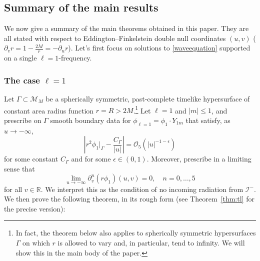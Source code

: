 \documentclass[11pt,english]{article}
\numberwithin{equation}{section}
\theoremstyle{remark}
\theoremstyle{plain}
\theoremstyle{remark}
\newcommand{\pu}{\partial_u}
\newcommand{\pv}{\partial_v}
\renewcommand{\(}{\left(}
\renewcommand{\)}{\right)}
\begin{document}
\subsection{Summary of the main results}\label{sec:intro:summary}
We now give a summary of the main theorems obtained in this paper. They are all stated with respect to Eddington--Finkelstein double null coordinates $(u,v)$ ($\pv r=1-\frac{2M}{r}=-\pu r$).
Let's first focus on solutions to \eqref{waveequation} supported on a single $\ell=1$-frequency.
\subsubsection{The case \texorpdfstring{$\ell=1$}{L=1}}\label{sec:1.2.1}
Let $\Gamma\subset \mathcal{M}_M$ be a spherically symmetric, past-complete timelike hypersurface of constant area radius function $r=R>2M$.\footnote{In fact, the theorem below also applies to spherically symmetric hypersurfaces $\Gamma$ on which $r$ is allowed to vary and, in particular, tend to infinity. We will show this in the main body of the paper.}
Let $\ell=1$ and $|m|\leq 1$, and prescribe on $\Gamma$ smooth boundary data for $\phi_{\ell=1}=\phi_1 \cdot Y_{1m}$ that satisfy, as $u\to-\infty$,
\begin{equation}\label{eq:intro:ass1}
\left|r^2\phi_1|_{\Gamma}-\frac{C_\Gamma}{|u|}\right|=\mathcal{O}_5(|u|^{-1-\epsilon})
\end{equation}
for some constant $C_\Gamma$ and for some $\epsilon\in(0,1)$.
Moreover, prescribe in  a limiting sense that%
\begin{equation}
\label{eq:intro:nir}
\lim_{u\to-\infty}\pv^n(r\phi_1)(u,v)=0, \quad n=0,\dots, 5
\end{equation}
for all $v\in \mathbb R$. 
We interpret this as the condition of no incoming radiation from $\mathcal I^-$.
We then prove the following theorem, in its rough form (see Theorem~\ref{thm:tl} for the precise version):
\end{document}
